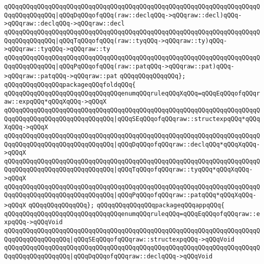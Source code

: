 \verb|qQQqqQQqqQQqqQQqqQQqqQQqqQQqqQQqqQQqqQQqqQQqqQQqqQQqqQQqqQQqqQQqqQQqqQQqqQQqqQQqqQQq|\verb#|qQQqDqQQqofqQQq(raw::declqQQq->qQQqraw::decl)qQQq->qQQqraw::declqQQq->qQQqraw::decl#\newline
\verb|qQQqqQQqqQQqqQQqqQQqqQQqqQQqqQQqqQQqqQQqqQQqqQQqqQQqqQQqqQQqqQQqqQQqqQQqqQQqqQQqqQQq|\verb#|qQQqTqQQqofqQQq(raw::tyqQQq->qQQqraw::ty)qQQq->qQQqraw::tyqQQq->qQQqraw::ty#\newline
\verb|qQQqqQQqqQQqqQQqqQQqqQQqqQQqqQQqqQQqqQQqqQQqqQQqqQQqqQQqqQQqqQQqqQQqqQQqqQQqqQQqqQQq|\verb#|qQQqPqQQqofqQQq(raw::patqQQq->qQQqraw::pat)qQQq->qQQqraw::patqQQq->qQQqraw::pat#\newline
\verb|qQQqqQQqqQQqqQQq};|\newline
\newline
\verb|qQQqqQQqqQQqqQQqpackageqQQqfoldqQQq{|\newline
\newline
\verb|qQQqqQQqqQQqqQQqqQQqqQQqqQQqqQQqenumqQQqruleqQQqXqQQq=qQQqEqQQqofqQQqraw::expqQQq*qQQqXqQQq->qQQqX|\newline
\verb|qQQqqQQqqQQqqQQqqQQqqQQqqQQqqQQqqQQqqQQqqQQqqQQqqQQqqQQqqQQqqQQqqQQqqQQqqQQqqQQqqQQqqQQqqQQqqQQqqQQq|\verb#|qQQqSEqQQqofqQQqraw::structexpqQQq*qQQqXqQQq->qQQqX#\newline
\verb|qQQqqQQqqQQqqQQqqQQqqQQqqQQqqQQqqQQqqQQqqQQqqQQqqQQqqQQqqQQqqQQqqQQqqQQqqQQqqQQqqQQqqQQqqQQqqQQqqQQq|\verb#|qQQqDqQQqofqQQqraw::declqQQq*qQQqXqQQq->qQQqX#\newline
\verb|qQQqqQQqqQQqqQQqqQQqqQQqqQQqqQQqqQQqqQQqqQQqqQQqqQQqqQQqqQQqqQQqqQQqqQQqqQQqqQQqqQQqqQQqqQQqqQQqqQQq|\verb#|qQQqTqQQqofqQQqraw::tyqQQq*qQQqXqQQq->qQQqX#\newline
\verb|qQQqqQQqqQQqqQQqqQQqqQQqqQQqqQQqqQQqqQQqqQQqqQQqqQQqqQQqqQQqqQQqqQQqqQQqqQQqqQQqqQQqqQQqqQQqqQQqqQQq|\verb#|qQQqPqQQqofqQQqraw::patqQQq*qQQqXqQQq->qQQqX#\newline
\verb|qQQqqQQqqQQqqQQq};|\newline
\newline
\verb|qQQqqQQqqQQqqQQqpackageqQQqappqQQq{|\newline
\newline
\verb|qQQqqQQqqQQqqQQqqQQqqQQqqQQqqQQqenumqQQqruleqQQq=qQQqEqQQqofqQQqraw::expqQQq->qQQqVoid|\newline
\verb|qQQqqQQqqQQqqQQqqQQqqQQqqQQqqQQqqQQqqQQqqQQqqQQqqQQqqQQqqQQqqQQqqQQqqQQqqQQqqQQqqQQqqQQq|\verb#|qQQqSEqQQqofqQQqraw::structexpqQQq->qQQqVoid#\newline
\verb|qQQqqQQqqQQqqQQqqQQqqQQqqQQqqQQqqQQqqQQqqQQqqQQqqQQqqQQqqQQqqQQqqQQqqQQqqQQqqQQqqQQqqQQq|\verb#|qQQqDqQQqofqQQqraw::declqQQq->qQQqVoid#\newline
